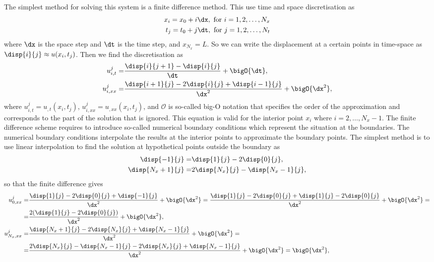 \documentclass[twoside,a4paper,12pt]{article}
\begin{document}
The simplest method for solving this system is a finite difference
method. This use time and space discretisation as
%
\begin{subequations}
  \begin{align}
    x_i = x_0 + i\dx, \text{ for } i = 1, 2, \dots, N_x \\
    t_j = t_0 + j\dt, \text{ for } j = 1, 2, \dots, N_t
  \end{align} \label{eq:discr}
\end{subequations}
%
where $\dx$ is the space step and $\dt$ is the time step, and $x_{N_x} = L$.  So we can
write the displacement at a certain points in time-space as
$\disp{i}{j} \approx u(x_i,t_j)$. Then we find the discretisation as
%
\begin{subequations}
  \begin{align}
    u_{i,t}^j  =& \frac{\disp{i}{j+1} - \disp{i}{j}}{\dt} + \bigO{\dt}, \\
    u_{i,xx}^j =& \frac{\disp{i+1}{j} - 2\disp{i}{j} + \disp{i-1}{j}}{\dx^2} + \bigO{\dx^2},
  \end{align}\label{eq:fin-diff}
\end{subequations}
%
where $u_{i,t}^j = u_{,t}(x_i,t_j)$, $u_{i,xx}^j = u_{,xx}(x_i,t_j)$,
and $\mathcal{O}$ is so-called big-O notation that specifies the order
of the approximation and corresponds to the part of the solution that
is ignored. This equation is valid for the interior point $x_i$ where
$i = 2,\dots, N_x-1$. The finite difference scheme requires to
introduce so-called numerical boundary conditions which represent the
situation at the boundaries. The numerical boundary conditions
interpolate the results at the interior points to approximate the
boundary points. The simplest method is to use linear interpolation to
find the solution at hypothetical points outside the boundary as
%
\begin{subequations}
\begin{align}
  \disp{-1}{j} =& \disp{1}{j} - 2\disp{0}{j}, \\
  \disp{N_x+1}{j} =& 2\disp{N_x}{j} - \disp{N_x-1}{j},
\end{align}
\end{subequations}
%
so that the finite difference gives
%
\begin{align}
  u_{0,xx}^j =& \frac{\disp{1}{j} - 2\disp{0}{j} + \disp{-1}{j}}{\dx^2} + \bigO{\dx^2} =
  \frac{\disp{1}{j} - 2\disp{0}{j} + \disp{1}{j} - 2\disp{0}{j}}{\dx^2} + \bigO{\dx^2} =\nonumber \\
  =&\frac{2(\disp{1}{j} - 2\disp{0}{j})}{\dx^2} + \bigO{\dx^2},
  \\
  u_{N_x,xx}^j =& \frac{\disp{N_x+1}{j} - 2\disp{N_x}{j} + \disp{N_x-1}{j}}{\dx^2} + \bigO{\dx^2} =\nonumber \\
  =&\frac{2\disp{N_x}{j} - \disp{N_x-1}{j} - 2\disp{N_x}{j} + \disp{N_x-1}{j}}{\dx^2} + \bigO{\dx^2} = \bigO{\dx^2},
\end{align}
\end{document}
